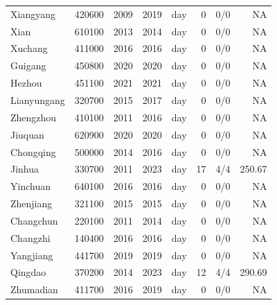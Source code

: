 \begin{longtable}{@{}llrrlrrr@{}}
Xiangyang & 420600 & 2009 & 2019 & day & 0 & 0/0 & NA \\
Xian & 610100 & 2013 & 2014 & day & 0 & 0/0 & NA \\
Xuchang & 411000 & 2016 & 2016 & day & 0 & 0/0 & NA \\
Guigang & 450800 & 2020 & 2020 & day & 0 & 0/0 & NA \\
Hezhou & 451100 & 2021 & 2021 & day & 0 & 0/0 & NA \\
Lianyungang & 320700 & 2015 & 2017 & day & 0 & 0/0 & NA \\
Zhengzhou & 410100 & 2011 & 2016 & day & 0 & 0/0 & NA \\
Jiuquan & 620900 & 2020 & 2020 & day & 0 & 0/0 & NA \\
Chongqing & 500000 & 2014 & 2016 & day & 0 & 0/0 & NA \\
Jinhua & 330700 & 2011 & 2023 & day & 17 & 4/4 & 250.67 \\
Yinchuan & 640100 & 2016 & 2016 & day & 0 & 0/0 & NA \\
Zhenjiang & 321100 & 2015 & 2015 & day & 0 & 0/0 & NA \\
Changchun & 220100 & 2011 & 2014 & day & 0 & 0/0 & NA \\
Changzhi & 140400 & 2016 & 2016 & day & 0 & 0/0 & NA \\
Yangjiang & 441700 & 2019 & 2019 & day & 0 & 0/0 & NA \\
Qingdao & 370200 & 2014 & 2023 & day & 12 & 4/4 & 290.69 \\
Zhumadian & 411700 & 2016 & 2019 & day & 0 & 0/0 & NA \\
\bottomrule\end{longtable}

\endgroup
